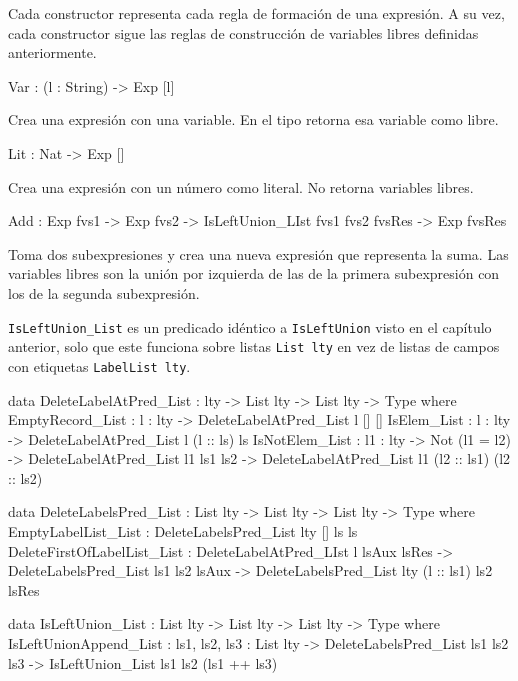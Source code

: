 Cada constructor representa cada regla de formación de una expresión. A su vez, cada constructor sigue las reglas de construcción de variables libres definidas anteriormente.

\begin{code}
Var : (l : String) -> Exp [l]
\end{code}

Crea una expresión con una variable. En el tipo retorna esa variable como libre.

\begin{code}
Lit : Nat -> Exp []
\end{code}

Crea una expresión con un número como literal. No retorna variables libres.

\begin{code}
Add : Exp fvs1 -> Exp fvs2 ->
  IsLeftUnion_LIst fvs1 fvs2 fvsRes ->
  Exp fvsRes
\end{code}

Toma dos subexpresiones y crea una nueva expresión que representa la suma. Las variables libres son la unión por izquierda de las de la primera subexpresión con los de la segunda subexpresión.

\texttt{IsLeftUnion\_List} es un predicado idéntico a \texttt{IsLeftUnion} visto en el capítulo anterior, solo que este funciona sobre listas \texttt{List lty} en vez de listas de campos con etiquetas \texttt{LabelList lty}.

\begin{code}
data DeleteLabelAtPred_List : lty -> List lty ->
  List lty -> Type where
  EmptyRecord_List : {l : lty} -> DeleteLabelAtPred_List l [] []
  IsElem_List : {l : lty} -> DeleteLabelAtPred_List l (l :: ls) ls
  IsNotElem_List : {l1 : lty} -> Not (l1 = l2) ->
    DeleteLabelAtPred_List l1 ls1 ls2 ->
    DeleteLabelAtPred_List l1 (l2 :: ls1) (l2 :: ls2)

data DeleteLabelsPred_List : List lty -> List lty ->
  List lty -> Type where
  EmptyLabelList_List : DeleteLabelsPred_List {lty} [] ls ls
  DeleteFirstOfLabelList_List : 
    DeleteLabelAtPred_LIst l lsAux lsRes ->
    DeleteLabelsPred_List ls1 ls2 lsAux ->
    DeleteLabelsPred_List {lty} (l :: ls1) ls2 lsRes

data IsLeftUnion_List : List lty -> List lty ->
  List lty -> Type where
  IsLeftUnionAppend_List :
    {ls1, ls2, ls3 : List lty} ->
    DeleteLabelsPred_List ls1 ls2 ls3 ->
    IsLeftUnion_List ls1 ls2 (ls1 ++ ls3)
\end{code}

